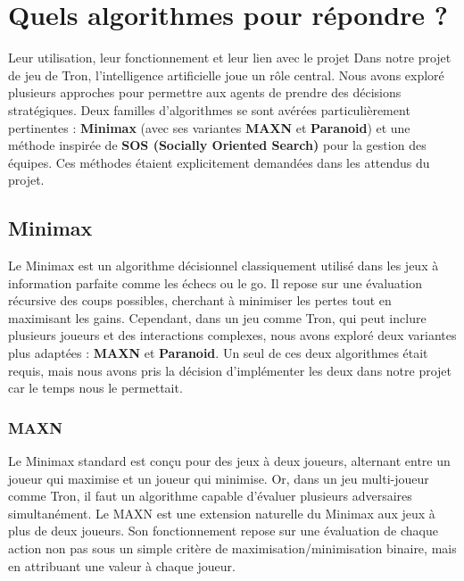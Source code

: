 \section{Quels algorithmes pour répondre ?}
Leur utilisation, leur fonctionnement et leur lien avec le projet
Dans notre projet de jeu de Tron, l'intelligence artificielle joue un rôle central. Nous avons exploré plusieurs approches pour permettre aux agents de prendre des décisions stratégiques. Deux familles d'algorithmes se sont avérées particulièrement pertinentes : \textbf{Minimax} (avec ses variantes \textbf{MAXN} et \textbf{Paranoid}) et une méthode inspirée de \textbf{SOS (Socially Oriented Search)} pour la gestion des équipes. Ces méthodes étaient explicitement demandées dans les attendus du projet.

\subsection{Minimax}
Le Minimax est un algorithme décisionnel classiquement utilisé dans les jeux à information parfaite comme les échecs ou le go. Il repose sur une évaluation récursive des coups possibles, cherchant à minimiser les pertes tout en maximisant les gains. Cependant, dans un jeu comme Tron, qui peut inclure plusieurs joueurs et des interactions complexes, nous avons exploré deux variantes plus adaptées : \textbf{MAXN} et \textbf{Paranoid}.
Un seul de ces deux algorithmes était requis, mais nous avons pris la décision d'implémenter les deux dans notre projet car le temps nous le permettait.

\subsubsection{MAXN}
Le Minimax standard est conçu pour des jeux à deux joueurs, alternant entre un joueur qui maximise et un joueur qui minimise. Or, dans un jeu multi-joueur comme Tron, il faut un algorithme capable d'évaluer plusieurs adversaires simultanément.
Le MAXN est une extension naturelle du Minimax aux jeux à plus de deux joueurs. Son fonctionnement repose sur une évaluation de chaque action non pas sous un simple critère de maximisation/minimisation binaire, mais en attribuant une valeur à chaque joueur.
\vspace{0.3cm}

